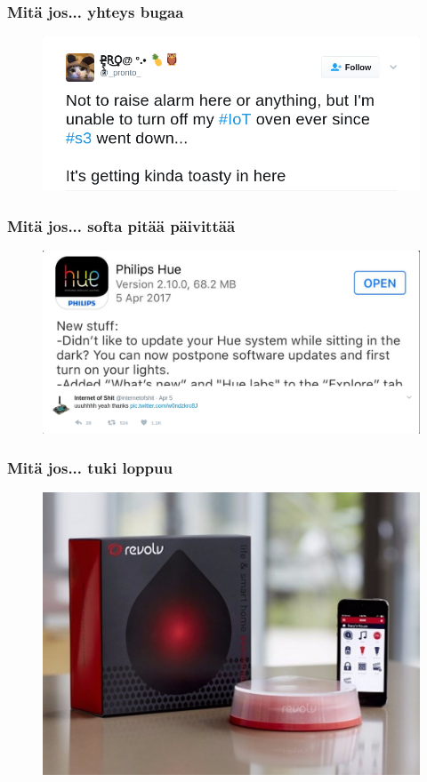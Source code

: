 \documentclass{beamer}
\begin{document}
\begin{frame}
\frametitle{Mitä jos... yhteys bugaa}
\begin{figure}
\includegraphics[width=\linewidth]{uuni2}
\end{figure}
\end{frame}

\begin{frame}
\frametitle{Mitä jos... softa pitää päivittää}
\begin{figure}
\includegraphics[width=\linewidth]{hue-update-in-the-dark}
\end{figure}
\end{frame}

\begin{frame}
\frametitle{Mitä jos... tuki loppuu}
\begin{figure}
\includegraphics[width=0.8\linewidth]{revolv}
\end{figure}
\end{frame}
\end{document}
